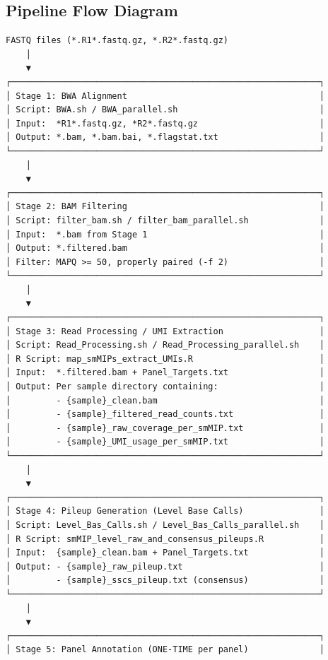 \documentclass[
]{article}
\begin{document}
\subsection{Pipeline Flow Diagram}\label{pipeline-flow-diagram}

\begin{verbatim}
FASTQ files (*.R1*.fastq.gz, *.R2*.fastq.gz)
    │
    ▼
┌─────────────────────────────────────────────────────────────┐
│ Stage 1: BWA Alignment                                      │
│ Script: BWA.sh / BWA_parallel.sh                            │
│ Input:  *R1*.fastq.gz, *R2*.fastq.gz                        │
│ Output: *.bam, *.bam.bai, *.flagstat.txt                    │
└─────────────────────────────────────────────────────────────┘
    │
    ▼
┌─────────────────────────────────────────────────────────────┐
│ Stage 2: BAM Filtering                                      │
│ Script: filter_bam.sh / filter_bam_parallel.sh              │
│ Input:  *.bam from Stage 1                                  │
│ Output: *.filtered.bam                                      │
│ Filter: MAPQ >= 50, properly paired (-f 2)                  │
└─────────────────────────────────────────────────────────────┘
    │
    ▼
┌─────────────────────────────────────────────────────────────┐
│ Stage 3: Read Processing / UMI Extraction                   │
│ Script: Read_Processing.sh / Read_Processing_parallel.sh    │
│ R Script: map_smMIPs_extract_UMIs.R                         │
│ Input:  *.filtered.bam + Panel_Targets.txt                  │
│ Output: Per sample directory containing:                    │
│         - {sample}_clean.bam                                │
│         - {sample}_filtered_read_counts.txt                 │
│         - {sample}_raw_coverage_per_smMIP.txt               │
│         - {sample}_UMI_usage_per_smMIP.txt                  │
└─────────────────────────────────────────────────────────────┘
    │
    ▼
┌─────────────────────────────────────────────────────────────┐
│ Stage 4: Pileup Generation (Level Base Calls)               │
│ Script: Level_Bas_Calls.sh / Level_Bas_Calls_parallel.sh    │
│ R Script: smMIP_level_raw_and_consensus_pileups.R           │
│ Input:  {sample}_clean.bam + Panel_Targets.txt              │
│ Output: - {sample}_raw_pileup.txt                           │
│         - {sample}_sscs_pileup.txt (consensus)              │
└─────────────────────────────────────────────────────────────┘
    │
    ▼
┌─────────────────────────────────────────────────────────────┐
│ Stage 5: Panel Annotation (ONE-TIME per panel)              │

\end{verbatim}
\end{document}
